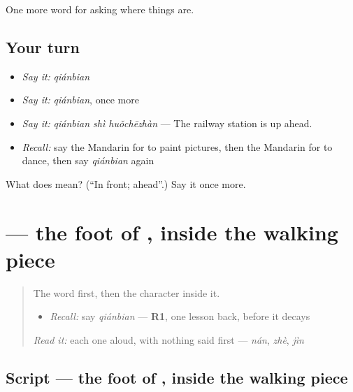 \begin{grammarlens}[title={What you've built}]
One more word for asking where things are.
\end{grammarlens}

\subsection*{Your turn}
\begin{itemize}
\raggedright
  \item \emph{Say it:} \emph{qiánbian}
  \item \emph{Say it:} \emph{qiánbian}, once more
  \item \emph{Say it:} \emph{qiánbian shì huǒchēzhàn} — The railway station is up ahead.
  \item \emph{Recall:} say the Mandarin for to paint pictures, then the Mandarin for to dance, then say \emph{qiánbian} again
\end{itemize}

\begin{tcolorbox}[breakable,colback=teal!4,colframe=teal!35!black,title={Before you move on}]
What does  mean? (\textquotedblleft{}In front; ahead\textquotedblright{}.) Say it once more.
\end{tcolorbox}
\section[\texorpdfstring{\zh{边} (biān)}{边 (biān)}]{ — the foot of , inside the walking piece}

\label{lesson:ZH-W111-bian}



\begin{quote}
The word first, then the character inside it.

\begin{itemize}
\raggedright
  \item \emph{Recall:} say \emph{qiánbian} — \textbf{R1}, one lesson back, before it decays
\end{itemize}

\begin{quote}
  
\end{quote}

\emph{Read it:} each one aloud, with nothing said first — \emph{nán}, \emph{zhè}, \emph{jìn}
\end{quote}

\subsection*{Script — the foot of , inside the walking piece}

